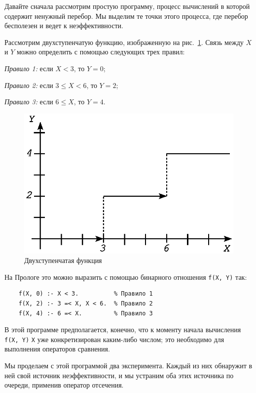 \documentclass[12pt, openany, twoside]{book} %
\begin{document}
Давайте сначала рассмотрим простую программу, процесс вычислений в которой содержит ненужный перебор. Мы выделим те точки этого процесса, где перебор бесполезен и ведет к неэффективности.

Рассмотрим двухступенчатую функцию, изображенную на рис.~\ref{pic:func_step}. Связь между $X$ и $Y$ можно определить с помощью следующих трех правил:

\emph{Правило 1:} если $X < 3$, то $Y = 0$;

\emph{Правило 2:} если $3 \leq X < 6$, то $Y = 2$;

\emph{Правило 3:} если $6 \leq X$, то $Y = 4$.

\begin{figure}[ht]
\begin{center}
\includegraphics[scale=0.7]{pics/func_step.eps}
\end{center}
\caption{Двухступенчатая функция} \label{pic:func_step}
\end{figure}

\noindent На Прологе это можно выразить с помощью бинарного отношения
\texttt{f(X, Y)} так:
{\tt \begin{verbatim}
    f(X, 0) :- X < 3.          % Правило 1
    f(X, 2) :- 3 =< X, X < 6.  % Правило 2
    f(X, 4) :- 6 =< X.         % Правило 3
\end{verbatim}}

В этой программе предполагается, конечно, что к моменту начала вычисления {\tt f(X, Y)} {\tt X} уже конкретизирован каким-либо числом; это необходимо для выполнения операторов сравнения.

Мы проделаем с этой программой два эксперимента. Каждый из них обнаружит в ней свой источник неэффективности, и мы устраним оба этих источника по очереди, применив оператор отсечения.
\end{document}
